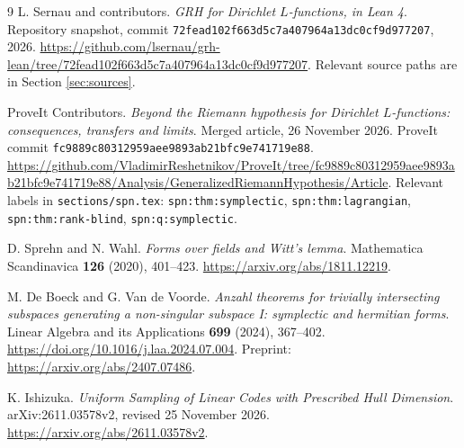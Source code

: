 \begin{thebibliography}{9}
L. Sernau and contributors.
\emph{GRH for Dirichlet $L$-functions, in Lean 4}.
Repository snapshot, commit
\texttt{72fead102f663d5c7a407964a13dc0cf9d977207}, 2026.
\url{https://github.com/lsernau/grh-lean/tree/72fead102f663d5c7a407964a13dc0cf9d977207}.
Relevant source paths are in Section \ref{sec:sources}.

ProveIt Contributors.
\emph{Beyond the Riemann hypothesis for Dirichlet $L$-functions:
consequences, transfers and limits}.
Merged article, 26 November 2026.
ProveIt commit \texttt{fc9889c80312959aee9893ab21bfc9e741719e88}.
\url{https://github.com/VladimirReshetnikov/ProveIt/tree/fc9889c80312959aee9893ab21bfc9e741719e88/Analysis/GeneralizedRiemannHypothesis/Article}.
Relevant labels in \texttt{sections/spn.tex}:
\texttt{spn:thm:symplectic}, \texttt{spn:thm:lagrangian},
\texttt{spn:thm:rank-blind}, \texttt{spn:q:symplectic}.

D. Sprehn and N. Wahl.
\emph{Forms over fields and Witt's lemma}.
Mathematica Scandinavica \textbf{126} (2020), 401--423.
\url{https://arxiv.org/abs/1811.12219}.

M. De Boeck and G. Van de Voorde.
\emph{Anzahl theorems for trivially intersecting subspaces generating
a non-singular subspace I: symplectic and hermitian forms}.
Linear Algebra and its Applications \textbf{699} (2024), 367--402.
\url{https://doi.org/10.1016/j.laa.2024.07.004}.
Preprint: \url{https://arxiv.org/abs/2407.07486}.

K. Ishizuka.
\emph{Uniform Sampling of Linear Codes with Prescribed Hull Dimension}.
arXiv:2611.03578v2, revised 25 November 2026.
\url{https://arxiv.org/abs/2611.03578v2}.
\end{thebibliography}

